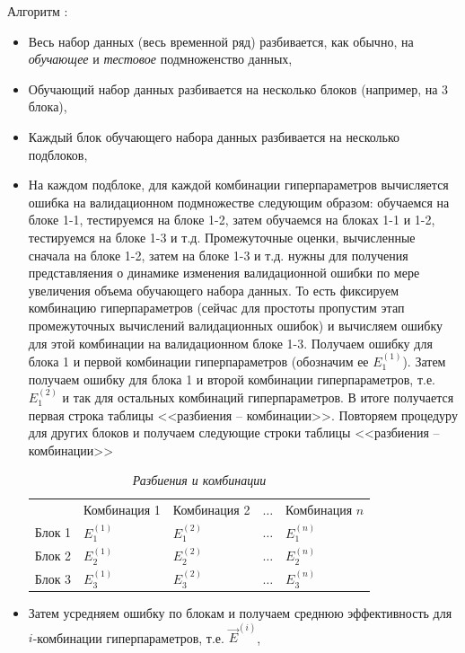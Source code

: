\documentclass[%
	11pt,
	a4paper,
	utf8,
		]{article}
\begin{document}
Алгоритм :
\begin{itemize}
	\item Весь набор данных (весь временной ряд) разбивается, как обычно, на \emph{обучающее} и \emph{тестовое} подмноженство данных,
	
	\item Обучающий набор данных разбивается на несколько блоков (например, на 3 блока),
	
	\item Каждый блок обучающего набора данных разбивается на несколько подблоков,
	
	\item На каждом подблоке, для каждой комбинации гиперпараметров вычисляется ошибка на валидационном подмножестве следующим образом: обучаемся на блоке 1-1, тестируемся на блоке 1-2, затем обучаемся на блоках 1-1 и 1-2, тестируемся на блоке 1-3 и т.д. Промежуточные оценки, вычисленные сначала на блоке 1-2, затем на блоке 1-3 и т.д. нужны для получения представляения о динамике изменения валидационной ошибки по мере увеличения объема обучающего набора данных. То есть фиксируем комбинацию гиперпараметров (сейчас для простоты пропустим этап промежуточных вычислений валидационных ошибок) и вычисляем ошибку для этой комбинации на валидационном блоке 1-3. Получаем ошибку для блока 1 и первой комбинации гиперпараметров (обозначим ее $ E_{1}^{(1)} $). Затем получаем ошибку для блока 1 и второй комбинации гиперпараметров, т.е. $ E_{1}^{(2)} $ и так для остальных комбинаций гиперпараметров. В итоге получается первая строка таблицы <<разбиения -- комбинации>>. Повторяем процедуру для других блоков и получаем следующие строки таблицы <<разбиения -- комбинации>>
	\begin{table}[h]
		\centering
		\caption{\itshape Разбиения и комбинации}\label{tab:splits_and_comb}
		\begin{tabular}{lllll}
		    {} & {Комбинация 1} & {Комбинация 2} & $ \ldots $ & {Комбинация $ n $} \\
			{Блок 1} & $ E_{1}^{(1)} $ & $ E_{1}^{(2)} $ & $ \ldots $ & $ E_{1}^{(n)} $ \\
			{Блок 2} & $ E_{2}^{(1)} $ & $ E_{2}^{(2)} $ & $ \ldots $ & $ E_{2}^{(n)} $ \\
			{Блок 3} & $ E_{3}^{(1)} $ & $ E_{3}^{(2)} $ & $ \ldots $ & $ E_{3}^{(n)} $
		\end{tabular}
	\end{table}
	
	
	\item Затем усредняем ошибку по блокам и получаем среднюю эффективность для $ i $-комбинации гиперпараметров, т.е. $ \vec{E}^{(i)} $,
	

\end{itemize}
\end{document}
